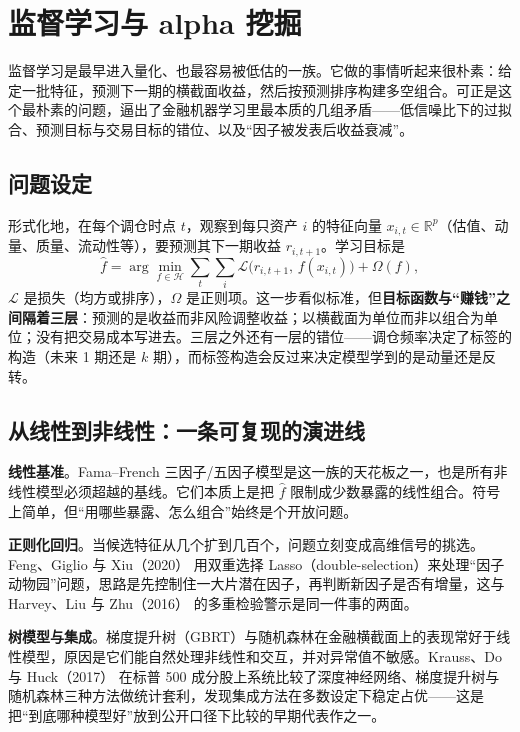\section{监督学习与 alpha 挖掘}\label{sec:supervised}

监督学习是最早进入量化、也最容易被低估的一族。它做的事情听起来很朴素：给定一批特征，预测下一期的横截面收益，然后按预测排序构建多空组合。可正是这个最朴素的问题，逼出了金融机器学习里最本质的几组矛盾——低信噪比下的过拟合、预测目标与交易目标的错位、以及“因子被发表后收益衰减”。

\subsection{问题设定}

形式化地，在每个调仓时点 $t$，观察到每只资产 $i$ 的特征向量 $x_{i,t}\in\mathbb{R}^p$（估值、动量、质量、流动性等），要预测其下一期收益 $r_{i,t+1}$。学习目标是
\begin{equation}
  \hat f = \arg\min_{f\in\mathcal{H}} \sum_{t}\sum_{i} \mathcal{L}\big(r_{i,t+1},\, f(x_{i,t})\big) + \Omega(f),
\end{equation}
$\mathcal{L}$ 是损失（均方或排序），$\Omega$ 是正则项。这一步看似标准，但\textbf{目标函数与“赚钱”之间隔着三层}：预测的是收益而非风险调整收益；以横截面为单位而非以组合为单位；没有把交易成本写进去。三层之外还有一层的错位——调仓频率决定了标签的构造（未来 1 期还是 $k$ 期），而标签构造会反过来决定模型学到的是动量还是反转。

\subsection{从线性到非线性：一条可复现的演进线}

\textbf{线性基准}。Fama--French 三因子/五因子模型是这一族的天花板之一，也是所有非线性模型必须超越的基线。它们本质上是把 $\hat f$ 限制成少数暴露的线性组合。符号上简单，但“用哪些暴露、怎么组合”始终是个开放问题。

\textbf{正则化回归}。当候选特征从几个扩到几百个，问题立刻变成高维信号的挑选。Feng、Giglio 与 Xiu（2020）\cite{fenggiglioxu2020} 用双重选择 Lasso（double-selection）来处理“因子动物园”问题，思路是先控制住一大片潜在因子，再判断新因子是否有增量，这与 Harvey、Liu 与 Zhu（2016）\cite{harveylz2016} 的多重检验警示是同一件事的两面。

\textbf{树模型与集成}。梯度提升树（GBRT）与随机森林在金融横截面上的表现常好于线性模型，原因是它们能自然处理非线性和交互，并对异常值不敏感。Krauss、Do 与 Huck（2017）\cite{krauss2017} 在标普 500 成分股上系统比较了深度神经网络、梯度提升树与随机森林三种方法做统计套利，发现集成方法在多数设定下稳定占优——这是把“到底哪种模型好”放到公开口径下比较的早期代表作之一。

